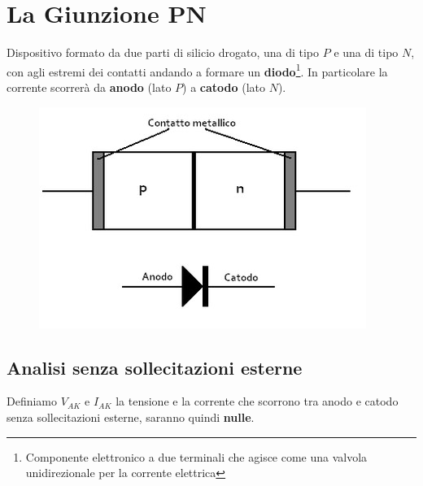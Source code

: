 \documentclass[11pt,a4paper,]{article}
\begin{document}
\section{La Giunzione PN}
\begin{definizione}
    [Giunzione PN]
    Dispositivo formato da due parti di silicio drogato, una di tipo $P$ e una di tipo $N$, con agli estremi dei contatti andando a formare un \textbf{diodo}\footnote{Componente elettronico a due terminali che agisce come una valvola unidirezionale per la corrente elettrica}.
    In particolare la corrente scorrerà da \textbf{anodo} (lato $P$) a \textbf{catodo} (lato $N$).
    \begin{figure}[H]
        \centering
        \includegraphics[width=0.5\linewidth]{img/giunz pn.png}
    \end{figure}
\end{definizione}
\subsection{Analisi senza sollecitazioni esterne}
Definiamo $V_{AK}$ e $I_{AK}$ la tensione e la corrente che scorrono tra anodo e catodo senza sollecitazioni esterne, saranno quindi \textbf{nulle}.
\end{document}
